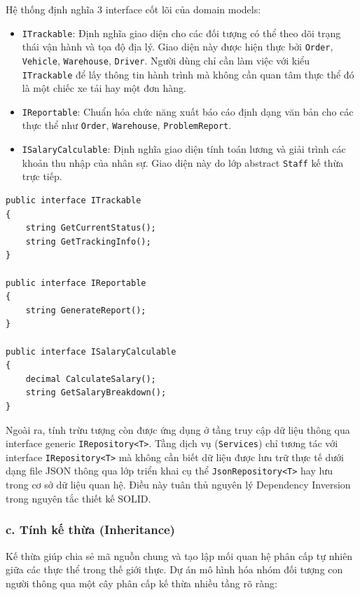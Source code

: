 \documentclass[12pt,a4paper]{article}
\begin{document}
Hệ thống định nghĩa 3 interface cốt lõi của domain models:
\begin{itemize}[leftmargin=1.2cm]
    \item \texttt{ITrackable}: Định nghĩa giao diện cho các đối tượng có thể theo dõi trạng thái vận hành và tọa độ địa lý. Giao diện này được hiện thực bởi \texttt{Order}, \texttt{Vehicle}, \texttt{Warehouse}, \texttt{Driver}. Người dùng chỉ cần làm việc với kiểu \texttt{ITrackable} để lấy thông tin hành trình mà không cần quan tâm thực thể đó là một chiếc xe tải hay một đơn hàng.
    \item \texttt{IReportable}: Chuẩn hóa chức năng xuất báo cáo định dạng văn bản cho các thực thể như \texttt{Order}, \texttt{Warehouse}, \texttt{ProblemReport}.
    \item \texttt{ISalaryCalculable}: Định nghĩa giao diện tính toán lương và giải trình các khoản thu nhập của nhân sự. Giao diện này do lớp abstract \texttt{Staff} kế thừa trực tiếp.
\end{itemize}

\begin{listing}[H]
\caption{Định nghĩa các interface cốt lõi thể hiện tính trừu tượng}
\begin{verbatim}
public interface ITrackable
{
    string GetCurrentStatus();
    string GetTrackingInfo();
}

public interface IReportable
{
    string GenerateReport();
}

public interface ISalaryCalculable
{
    decimal CalculateSalary();
    string GetSalaryBreakdown();
}
\end{verbatim}
\end{listing}

Ngoài ra, tính trừu tượng còn được ứng dụng ở tầng truy cập dữ liệu thông qua interface generic \texttt{IRepository<T>}. Tầng dịch vụ (\texttt{Services}) chỉ tương tác với interface \texttt{IRepository<T>} mà không cần biết dữ liệu được lưu trữ thực tế dưới dạng file JSON thông qua lớp triển khai cụ thể \texttt{JsonRepository<T>} hay lưu trong cơ sở dữ liệu quan hệ. Điều này tuân thủ nguyên lý Dependency Inversion trong nguyên tắc thiết kế SOLID.

\subsubsection*{c. Tính kế thừa (Inheritance)}

Kế thừa giúp chia sẻ mã nguồn chung và tạo lập mối quan hệ phân cấp tự nhiên giữa các thực thể trong thế giới thực. Dự án mô hình hóa nhóm đối tượng con người thông qua một cây phân cấp kế thừa nhiều tầng rõ ràng:
\end{document}
